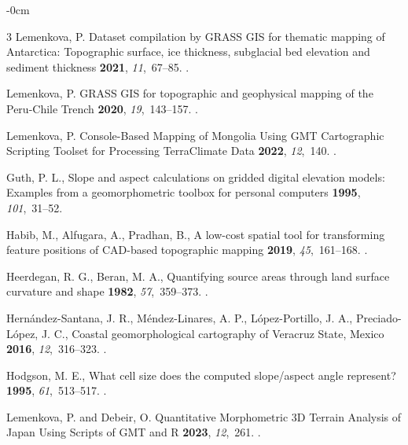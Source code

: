 \documentclass[technologies,article,submit,pdftex,moreauthors]{Definitions/mdpi}
\begin{document}
\begin{adjustwidth}{-\extralength}{0cm}
\begin{thebibliography}{3}
Lemenkova, P. 
\newblock Dataset compilation by GRASS GIS for thematic mapping of Antarctica: Topographic surface, ice thickness, subglacial bed elevation and sediment thickness
 {\bf 2021}, {\em 11},~67--85. 
.

Lemenkova, P.
\newblock GRASS GIS for topographic and geophysical mapping of the Peru-Chile Trench
 {\bf 2020}, {\em 19},~143--157. 
.

Lemenkova, P. 
\newblock Console-Based Mapping of Mongolia Using GMT Cartographic Scripting Toolset for Processing TerraClimate Data
 {\bf 2022}, {\em 12},~140. 
.

 Guth, P. L., 
\newblock Slope and aspect calculations on gridded digital elevation models: Examples from a geomorphometric toolbox for personal computers
 {\bf 1995}, {\em 101},~31--52. 

Habib, M., Alfugara, A., Pradhan, B., 
\newblock A low-cost spatial tool for transforming feature positions of CAD-based topographic mapping
 {\bf 2019}, {\em 45},~161--168. 
.

Heerdegan, R. G., Beran, M. A.,
\newblock Quantifying source areas through land surface curvature and shape
 {\bf 1982}, {\em 57},~359--373. 
.

Hernández-Santana, J. R., Méndez-Linares, A. P., López-Portillo, J. A., Preciado-López, J. C., 
\newblock Coastal geomorphological cartography of Veracruz State, Mexico
 {\bf 2016}, {\em 12},~316--323. 
.

Hodgson, M. E.,
\newblock What cell size does the computed slope/aspect angle represent?
 {\bf 1995}, {\em 61},~513--517. 
.

Lemenkova, P. and Debeir, O.
\newblock Quantitative Morphometric 3D Terrain Analysis of Japan Using Scripts of GMT and R
 {\bf 2023}, {\em 12},~261. 
.


\end{thebibliography}
\end{adjustwidth}
\end{document}
